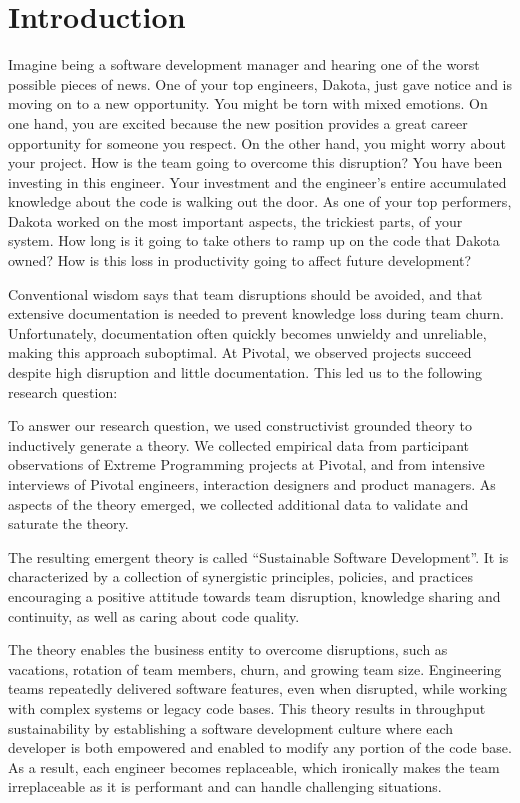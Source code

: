 \section{Introduction}

Imagine being a software development manager and hearing one of the worst possible pieces of news.  One of your top engineers, Dakota, just gave notice and is moving on to a new opportunity. You might be torn with mixed emotions. On one hand, you are excited because the new position provides a great career opportunity for someone you respect. On the other hand, you might worry about your project. How is the team going to overcome this disruption? You have been investing in this engineer. Your investment and the engineer's entire accumulated knowledge about the code is walking out the door.  As one of your top performers, Dakota worked on the most important aspects, the trickiest parts, of your system. How long is it going to take others to ramp up on the code that Dakota owned? How is this loss in productivity going to affect future development? 

Conventional wisdom says that team disruptions should be avoided, and that extensive documentation is needed to prevent knowledge loss during team churn. Unfortunately, documentation often quickly becomes unwieldy and unreliable, making this approach suboptimal. At Pivotal, we observed projects succeed despite high disruption and little documentation. This led us to the following research question: 

To answer our research question, we used constructivist grounded theory to inductively generate a theory. We collected empirical data from participant observations of Extreme Programming projects at Pivotal, and from intensive interviews of Pivotal engineers, interaction designers and product managers. As aspects of the theory emerged, we collected additional data to validate and saturate the theory.

The resulting emergent theory is called “Sustainable Software Development”. It is characterized by a collection of synergistic principles, policies, and practices encouraging a positive attitude towards team disruption, knowledge sharing and continuity, as well as caring about code quality. 

The theory enables the business entity to overcome disruptions, such as vacations, rotation of team members, churn, and growing team size. Engineering teams repeatedly delivered software features, even when disrupted, while working with complex systems or legacy code bases. This theory results in throughput sustainability by establishing a software development culture where each developer is both empowered and enabled to modify any portion of the code base. As a result, each engineer becomes replaceable, which ironically makes the team irreplaceable as it is performant and can handle challenging situations. 


